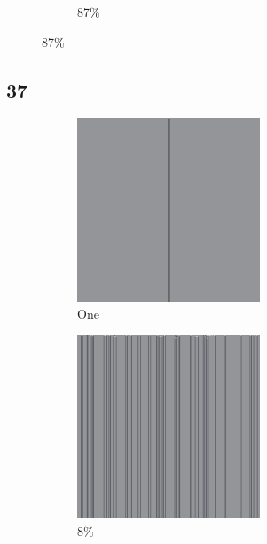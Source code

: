 \documentclass[12pt, fleqn]{report}                             %
\theoremstyle{break}                                            %
\begin{document}
\begin{figure}[ht!]
\begin{subfigure}[b]{0.4\linewidth}
          \caption{87\%}
        \end{subfigure}
      \end{figure}


      \clearpage
      \subsection{37}
      \begin{figure}[ht!]
        \centering
        \begin{subfigure}[b]{0.4\linewidth}
          \includegraphics[width=0.6\textwidth]{Images/37/a.png}
          \caption{One}
        \end{subfigure}
        \begin{subfigure}[b]{0.4\linewidth}
          \includegraphics[width=0.6\textwidth]{Images/37/b.png}
          \caption{8\%}
        \end{subfigure}
        \begin{subfigure}[b]{0.4\linewidth}

\end{subfigure}
\end{figure}
\end{document}
